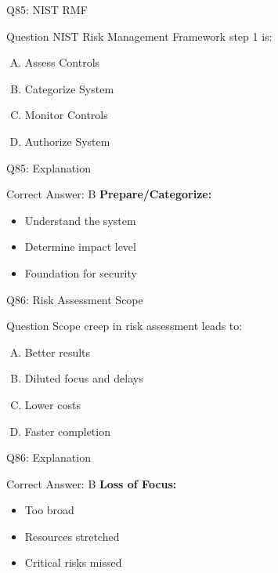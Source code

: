 \documentclass{beamer}
\begin{document}
			\begin{frame}{Q85: NIST RMF}
				\begin{block}{Question}
					NIST Risk Management Framework step 1 is:
				\end{block}
				\begin{enumerate}[(A)]
					\item Assess Controls
					\item Categorize System
					\item Monitor Controls
					\item Authorize System
				\end{enumerate}
			\end{frame}
			\begin{frame}{Q85: Explanation}
				\begin{block}{Correct Answer: B}
					\textbf{Prepare/Categorize:}
					\begin{itemize}
						\item Understand the system
						\item Determine impact level
						\item Foundation for security
					\end{itemize}
				\end{block}
			\end{frame}
			
			\begin{frame}{Q86: Risk Assessment Scope}
				\begin{block}{Question}
					Scope creep in risk assessment leads to:
				\end{block}
				\begin{enumerate}[(A)]
					\item Better results
					\item Diluted focus and delays
					\item Lower costs
					\item Faster completion
				\end{enumerate}
			\end{frame}
			\begin{frame}{Q86: Explanation}
				\begin{block}{Correct Answer: B}
					\textbf{Loss of Focus:}
					\begin{itemize}
						\item Too broad
						\item Resources stretched
						\item Critical risks missed
					\end{itemize}
				\end{block}
			\end{frame}
			
\end{document}
